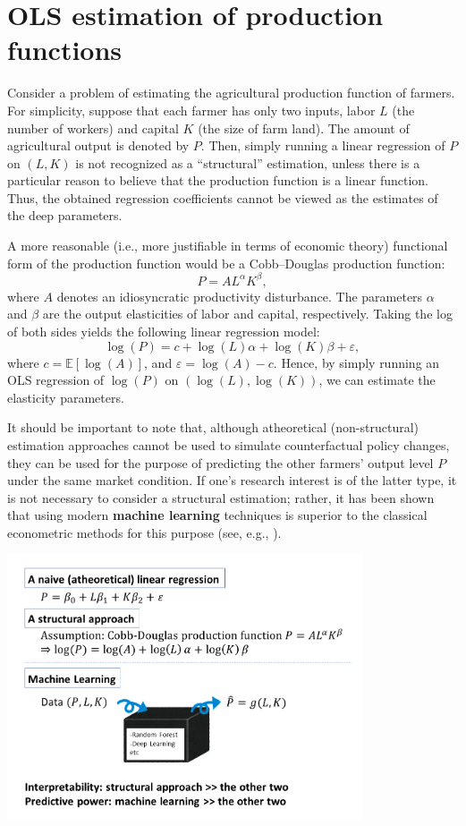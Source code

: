 \documentclass[10.5pt, A4paper, openany, uplatex]{book}
\newcommand{\eps}{\varepsilon}
\newcommand{\E}{\mathbb{E}}
\numberwithin{equation}{section}
\begin{document}
\section{OLS estimation of production functions}
Consider a problem of estimating the agricultural production function of farmers.
For simplicity, suppose that each  farmer has only two inputs, labor $L$ (the number of workers) and capital $K$ (the size of farm land). 
The amount of agricultural output is denoted by $P$.
Then, simply running a linear regression of $P$ on $(L,K)$ is not recognized as a ``structural'' estimation, unless there is a particular reason to believe that the production function is a linear function.
Thus, the obtained regression coefficients cannot be viewed as the estimates of the deep parameters.

A more reasonable (i.e., more justifiable in terms of economic theory) functional form of the production function would be a Cobb--Douglas production function:
\[
	P = A L^\alpha K^\beta,
\] 
where $A$  denotes an idiosyncratic productivity disturbance.
The parameters $\alpha$ and $\beta$ are the output elasticities of labor and capital, respectively.
Taking the log of both sides yields the following linear regression model:
\[
	\log(P) = c + \log(L) \alpha + \log(K) \beta + \eps,
\]
where $c = \E[\log(A)]$, and $\eps = \log(A) - c$.
Hence, by simply running an OLS regression of $\log(P)$ on $(\log(L), \log(K))$, we can estimate the elasticity parameters.

It should be important to note that, although atheoretical (non-structural) estimation approaches cannot be used to simulate counterfactual policy changes, they can be used for the purpose of predicting the other farmers' output level $P$ under the same market condition.
If one's research interest is of the latter type, it is not necessary to consider a structural estimation; rather, it has been shown that using modern \textbf{machine learning} techniques is superior to the classical econometric methods for this purpose (see, e.g., \cite{bajari2015machine}).

\begin{center}
	\includegraphics[width = 10.5cm]{prodfunc.png}
\end{center}
\end{document}
